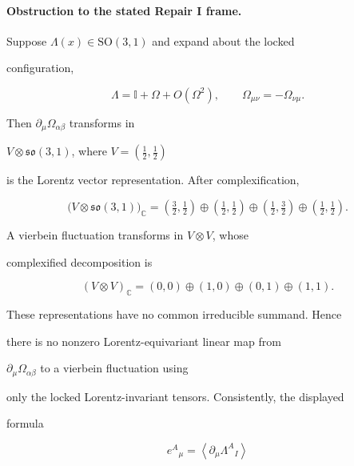 \paragraph{Obstruction to the stated Repair I frame.}

Suppose \(\Lambda(x)\in\mathrm{SO}(3,1)\) and expand about the locked

configuration,

\[

\Lambda=\mathbb I+\Omega+O(\Omega^2),

\qquad

\Omega_{\mu\nu}=-\Omega_{\nu\mu}.

\]

Then \(\partial_\mu\Omega_{\alpha\beta}\) transforms in

\(V\otimes\mathfrak{so}(3,1)\), where \(V=(\tfrac12,\tfrac12)\)

is the Lorentz vector representation. After complexification,

\[

\bigl(V\otimes\mathfrak{so}(3,1)\bigr)_{\mathbb C}

=

\left(\tfrac32,\tfrac12\right)

\oplus\left(\tfrac12,\tfrac12\right)

\oplus\left(\tfrac12,\tfrac32\right)

\oplus\left(\tfrac12,\tfrac12\right).

\]

A vierbein fluctuation transforms in \(V\otimes V\), whose

complexified decomposition is

\[

(V\otimes V)_{\mathbb C}

=

(0,0)\oplus(1,0)\oplus(0,1)\oplus(1,1).

\]

These representations have no common irreducible summand. Hence

there is no nonzero Lorentz-equivariant linear map from

\(\partial_\mu\Omega_{\alpha\beta}\) to a vierbein fluctuation using

only the locked Lorentz-invariant tensors. Consistently, the displayed

formula

\[

e^A{}_\mu=\left\langle\partial_\mu\Lambda^A{}_I\right\rangle

\]

